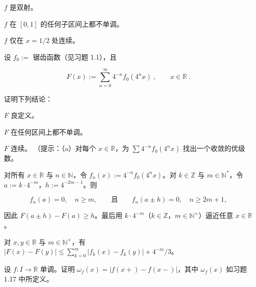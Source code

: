 \begin{exercises}
\begin{items}
$ f $ 是双射。

\item

$ f $ 在 $[0,1]$ 的任何子区间上都不单调。

\item

$ f $ 仅在 $ x = 1/2 $ 处连续。

\end{items}

\item

设 $ f_{0} := $ 锯齿函数（见习题 1.1），且

\[
F(x):=\sum_{n=0}^{\infty}4^{-n}f_{0}(4^{n}x)~,\qquad x\in\mathbb{R}~.
\]

证明下列结论：

\begin{items}
\item

$ F $ 良定义。

\item

$ F $ 在任何区间上都不单调。

\item

$ F $ 连续。
（提示：（a）对每个 $ x \in \mathbb{R} $，为 $ \sum 4^{-n} f_0(4^n x) $ 找出一个收敛的优级数。

\end{items}

\begin{items}
\item[（b）]

对所有 $ x \in \mathbb{R} $ 与 $ n \in \mathbb{N} $，令 $ f_n(x) := 4^{-n} f_0(4^n x) $。对 $ k \in \mathbb{Z} $ 与 $ m \in \mathbb{N}^* $，令 $ a := k \cdot 4^{-m} $，$ h := 4^{-2m-1} $。则

\[
f_{n}(a)=0,\quad n\geq m,\qquad\text{且}\qquad f_{n}(a\pm h)=0,\quad n\geq2m+1,
\]

因此 $ F(a \pm h) - F(a) \geq h $。最后用 $ k \cdot 4^{-m} $（$ k \in \mathbb{Z} $，$ m \in \mathbb{N}^\times $）逼近任意 $ x \in \mathbb{R} $。

\item[（c）]

对 $ x, y \in \mathbb{R} $ 与 $ m \in \mathbb{N}^\times $，有 $ |F(x) - F(y)| \leq \sum_{k=0}^{m} |f_k(x) - f_k(y)| + 4^{-m}/3 $。

\end{items}

\item

设 $f: I \to \mathbb{R}$ 单调。证明 $\omega_f(x) = |f(x+) - f(x-)|$，其中 $\omega_f(x)$ 如习题 1.17 中所定义。

\end{exercises}

